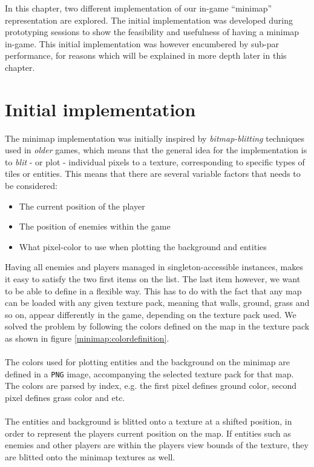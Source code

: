 In this chapter,  two different implementation of our in-game
``minimap'' representation are explored. The initial implementation was developed during prototyping sessions to show
the feasibility and usefulness of having a minimap in-game. This initial
implementation was however encumbered by sub-par performance,
for reasons which will be explained in more depth later in this chapter.

\section{Initial implementation}
The minimap implementation was initially inspired by \textit{bitmap-blitting}
techniques used in \textit{older} games, which means that the general idea for
the implementation is to \textit{blit} - or plot - individual pixels to a
texture, corresponding to specific types of tiles or entities. This means that
there are several variable factors that needs to be considered:
\begin{itemize}
    \item The current position of the player
    \item The position of enemies within the game 
    \item What pixel-color to use when plotting the background and entities
\end{itemize}
Having all enemies and players managed in singleton-accessible instances,
makes it easy to satisfy the two first items on the list. The last item
however, we want to be able to define in a flexible way. This
has to do with the fact that any map can be loaded with any given
texture pack, meaning that walls, ground, grass and so on, appear differently
in the game, depending on the texture pack used.
We solved the problem by following the colors defined on the map in the texture pack as shown in figure \ref{minimap:colordefinition}.
\\
\\
The colors used for plotting entities and the background on the minimap are
defined in a \texttt{PNG} image, accompanying the selected texture pack for that
map. The colors are parsed by index, e.g. the first pixel defines ground
color, second pixel defines grass color and etc.
\\
\\
The entities and background is blitted onto a texture at a shifted position, in
order to represent the players current position on the map. If entities such as
enemies and other players are within the players view bounds of the
texture, they are blitted onto the minimap textures as well. 

